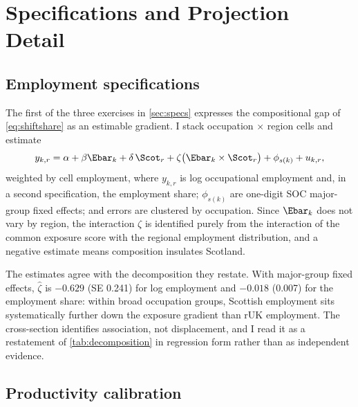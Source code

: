\section{Specifications and Projection Detail}\label{app:specifications}

\subsection{Employment specifications}

The first of the three exercises in \cref{sec:specs} expresses the compositional gap of \cref{eq:shiftshare} as an estimable gradient. I stack occupation $\times$ region cells and estimate
\begin{equation}\label{eq:employment}
y_{k,r} = \alpha + \beta \Ebar_k + \delta\, \Scot_r +
\zeta \bigl( \Ebar_k \times \Scot_r \bigr) + \phi_{s(k)} + u_{k,r},
\end{equation}
weighted by cell employment, where $y_{k,r}$ is log occupational employment and, in a second specification, the employment share; $\phi_{s(k)}$ are one-digit SOC major-group fixed effects; and errors are clustered by occupation. Since $\Ebar_k$ does not vary by region, the interaction $\zeta$ is identified purely from the interaction of the common exposure score with the regional employment distribution, and a negative estimate means composition insulates Scotland.

The estimates agree with the decomposition they restate. With major-group fixed effects, $\widehat{\zeta}$ is $-0.629$ (SE 0.241) for log employment and $-0.018$ (0.007) for the employment share: within broad occupation groups, Scottish employment sits systematically further down the exposure gradient than rUK employment. The cross-section identifies association, not displacement, and I read it as a restatement of \cref{tab:decomposition} in regression form rather than as independent evidence.

\subsection{Productivity calibration}

